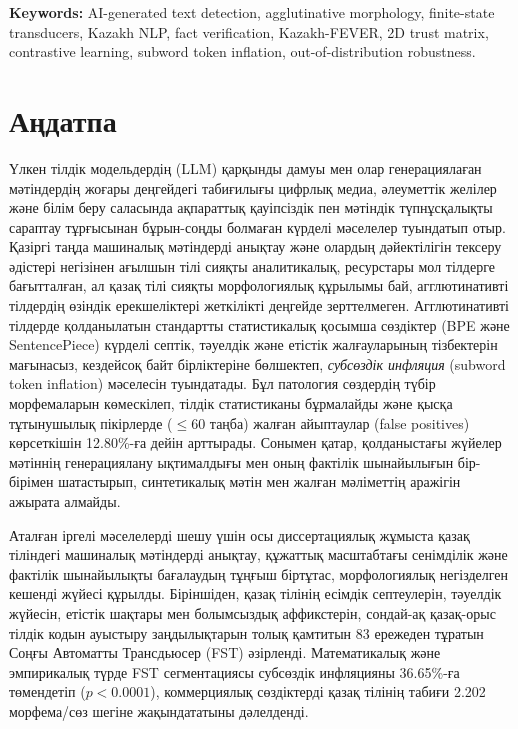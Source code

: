 \vspace{0.8em}
\noindent\textbf{Keywords:} AI-generated text detection, agglutinative morphology, finite-state transducers, Kazakh NLP, fact verification, Kazakh-FEVER, 2D trust matrix, contrastive learning, subword token inflation, out-of-distribution robustness.

\clearpage

\section*{Аңдатпа}

Үлкен тілдік модельдердің (LLM) қарқынды дамуы мен олар генерациялаған мәтіндердің жоғары деңгейдегі табиғилығы цифрлық медиа, әлеуметтік желілер және білім беру саласында ақпараттық қауіпсіздік пен мәтіндік түпнұсқалықты сараптау тұрғысынан бұрын-соңды болмаған күрделі мәселелер туындатып отыр. Қазіргі таңда машиналық мәтіндерді анықтау және олардың дәйектілігін тексеру әдістері негізінен ағылшын тілі сияқты аналитикалық, ресурстары мол тілдерге бағытталған, ал қазақ тілі сияқты морфологиялық құрылымы бай, агглютинативті тілдердің өзіндік ерекшеліктері жеткілікті деңгейде зерттелмеген. Агглютинативті тілдерде қолданылатын стандартты статистикалық қосымша сөздіктер (BPE және SentencePiece) күрделі септік, тәуелдік және етістік жалғауларының тізбектерін мағынасыз, кездейсоқ байт бірліктеріне бөлшектеп, \textit{субсөздік инфляция} (subword token inflation) мәселесін туындатады. Бұл патология сөздердің түбір морфемаларын көмескілеп, тілдік статистиканы бұрмалайды және қысқа тұтынушылық пікірлерде ($\le 60$ таңба) жалған айыптаулар (false positives) көрсеткішін 12.80\%-ға дейін арттырады. Сонымен қатар, қолданыстағы жүйелер мәтіннің генерациялану ықтималдығы мен оның фактілік шынайылығын бір-бірімен шатастырып, синтетикалық мәтін мен жалған мәліметтің аражігін ажырата алмайды.

Аталған іргелі мәселелерді шешу үшін осы диссертациялық жұмыста қазақ тіліндегі машиналық мәтіндерді анықтау, құжаттық масштабтағы сенімділік және фактілік шынайылықты бағалаудың тұңғыш біртұтас, морфологиялық негізделген кешенді жүйесі құрылды. Біріншіден, қазақ тілінің есімдік септеулерін, тәуелдік жүйесін, етістік шақтары мен болымсыздық аффикстерін, сондай-ақ қазақ-орыс тілдік кодын ауыстыру заңдылықтарын толық қамтитын 83 ережеден тұратын Соңғы Автоматты Трансдьюсер (FST) әзірленді. Математикалық және эмпирикалық түрде FST сегментациясы субсөздік инфляцияны 36.65\%-ға төмендетіп ($p < 0.0001$), коммерциялық сөздіктерді қазақ тілінің табиғи 2.202 морфема/сөз шегіне жақындататыны дәлелденді. 


